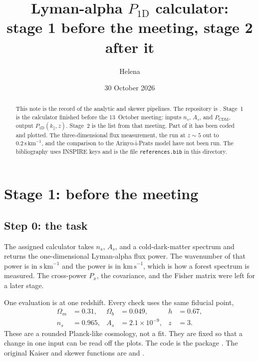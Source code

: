 \documentclass[11pt]{article}
\title{Lyman-alpha $P_{1\mathrm{D}}$ calculator:\\
stage 1 before the meeting, stage 2 after it}
\author{Helena}
\date{30 October 2026}
\begin{document}
\maketitle

\begin{abstract}
This note is the record of the analytic and skewer pipelines.
The repository is
.
Stage~1 is the calculator finished before the 13~October meeting:
inputs $n_s$, $A_s$, and $P_\mathrm{CDM}$, output $P_{1\mathrm{D}}(k_\parallel,z)$.
Stage~2 is the list from that meeting. Part of it has been coded and plotted.
The three-dimensional flux measurement, the run at $z\sim 5$ out to
$0.2\,\mathrm{s\,km}^{-1}$, and the comparison to the Arinyo-i-Prats model
have not been run. The bibliography uses INSPIRE keys and is the file
\texttt{references.bib} in this directory.
\end{abstract}

\section{Stage 1: before the meeting}
\label{sec:stage1}

\subsection{Step 0: the task}

The assigned calculator takes $n_s$, $A_s$, and a cold-dark-matter spectrum and returns the one-dimensional Lyman-alpha flux power. The wavenumber of that power is in $\mathrm{s\,km}^{-1}$ and the power is in $\mathrm{km\,s}^{-1}$, which is how a forest spectrum is measured. The cross-power $P_x$, the covariance, and the Fisher matrix were left for a later stage.

One evaluation is at one redshift. Every check uses the same fiducial point,
\begin{equation}
\begin{aligned}
\Omega_m &= 0.31, &
\Omega_b &= 0.049, &
h &= 0.67, \\
n_s &= 0.965, &
A_s &= 2.1\times 10^{-9}, &
z &= 3.
\end{aligned}
\end{equation}
These are a rounded Planck-like cosmology, not a fit. They are fixed so that a change in one input can be read off the plots. The code is the package . The original Kaiser and skewer functions are  and .
\end{document}
